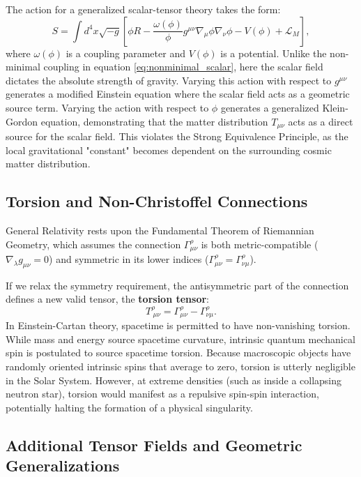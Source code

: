 \documentclass[11pt, a4paper]{report}
\begin{document}
The action for a generalized scalar-tensor theory takes the form:
\begin{equation}
S = \int d^{4}x \sqrt{-g} \left[ \phi R - \frac{\omega(\phi)}{\phi} g^{\mu\nu}\nabla_{\mu}\phi\nabla_{\nu}\phi - V(\phi) + \mathcal{L}_{M} \right],
\end{equation}
where $\omega(\phi)$ is a coupling parameter and $V(\phi)$ is a potential. 
Unlike the non-minimal coupling in equation \eqref{eq:nonminimal_scalar}, here the scalar field dictates the absolute strength of gravity. Varying this action with respect to $g^{\mu\nu}$ generates a modified Einstein equation where the scalar field acts as a geometric source term. Varying the action with respect to $\phi$ generates a generalized Klein-Gordon equation, demonstrating that the matter distribution $T_{\mu\nu}$ acts as a direct source for the scalar field. This violates the Strong Equivalence Principle, as the local gravitational "constant" becomes dependent on the surrounding cosmic matter distribution.

\subsection{Torsion and Non-Christoffel Connections}

General Relativity rests upon the Fundamental Theorem of Riemannian Geometry, which assumes the connection $\Gamma^{\rho}_{\mu\nu}$ is both metric-compatible ($\nabla_{\lambda}g_{\mu\nu} = 0$) and symmetric in its lower indices ($\Gamma^{\rho}_{\mu\nu} = \Gamma^{\rho}_{\nu\mu}$). 

If we relax the symmetry requirement, the antisymmetric part of the connection defines a new valid tensor, the \textbf{torsion tensor}:
\begin{equation}
T^{\rho}_{\ \mu\nu} = \Gamma^{\rho}_{\mu\nu} - \Gamma^{\rho}_{\nu\mu}.
\end{equation}
In Einstein-Cartan theory, spacetime is permitted to have non-vanishing torsion. While mass and energy source spacetime curvature, intrinsic quantum mechanical spin is postulated to source spacetime torsion. Because macroscopic objects have randomly oriented intrinsic spins that average to zero, torsion is utterly negligible in the Solar System. However, at extreme densities (such as inside a collapsing neutron star), torsion would manifest as a repulsive spin-spin interaction, potentially halting the formation of a physical singularity.

\subsection{Additional Tensor Fields and Geometric Generalizations}
\end{document}
